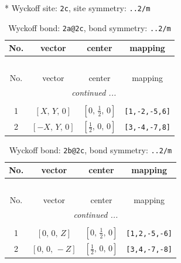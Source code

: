 \documentclass[fleqn,8pt]{jsarticle}
\begin{document}
* Wyckoff site: {\tt 2c}, site symmetry: {\tt ..2/m}
\renewcommand{\arraystretch}{1.2}
\begin{longtable}{cccc}
\caption{Wyckoff bond: {\tt 2a@2c}, bond symmetry: {\tt ..2/m}}
 \\
 \hline \hline
No. & vector & center & mapping \\ \hline \endfirsthead

\multicolumn{3}{l}{\tablename\ \thetable{}} \\
 \hline \hline
No. & vector & center & mapping \\ \hline \endhead

 \hline \hline
\multicolumn{3}{r}{\footnotesize\it continued ...} \\ \endfoot

 \hline \hline
\multicolumn{3}{r}{} \\ \endlastfoot

1 & $\left[ X,\, Y,\, 0 \right]$ & $\left[ 0,\, \frac{1}{2},\, 0 \right]$ & {\tt [1,-2,-5,6]} \\ \hline
2 & $\left[ - X,\, Y,\, 0 \right]$ & $\left[ \frac{1}{2},\, 0,\, 0 \right]$ & {\tt [3,-4,-7,8]} \\
\end{longtable}
\renewcommand{\arraystretch}{1.2}
\begin{longtable}{cccc}
\caption{Wyckoff bond: {\tt 2b@2c}, bond symmetry: {\tt ..2/m}}
 \\
 \hline \hline
No. & vector & center & mapping \\ \hline \endfirsthead

\multicolumn{3}{l}{\tablename\ \thetable{}} \\
 \hline \hline
No. & vector & center & mapping \\ \hline \endhead

 \hline \hline
\multicolumn{3}{r}{\footnotesize\it continued ...} \\ \endfoot

 \hline \hline
\multicolumn{3}{r}{} \\ \endlastfoot

1 & $\left[ 0,\, 0,\, Z \right]$ & $\left[ 0,\, \frac{1}{2},\, 0 \right]$ & {\tt [1,2,-5,-6]} \\ \hline
2 & $\left[ 0,\, 0,\, - Z \right]$ & $\left[ \frac{1}{2},\, 0,\, 0 \right]$ & {\tt [3,4,-7,-8]} \\
\end{longtable}
\renewcommand{\arraystretch}{1.2}
\end{document}
